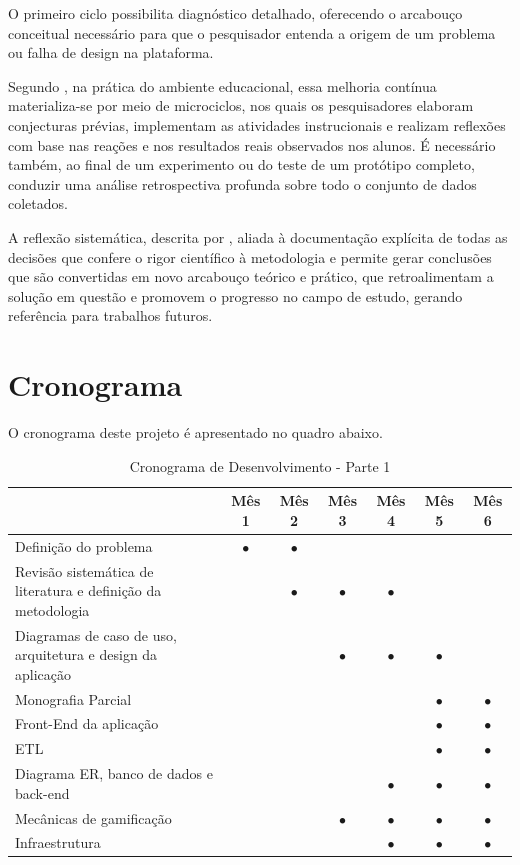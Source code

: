 \documentclass{abnt}
\begin{document}
O primeiro ciclo possibilita diagnóstico detalhado, oferecendo o arcabouço
conceitual necessário para que o pesquisador entenda a origem de um problema ou
falha de design na plataforma. 

Segundo \cite{obrien2018practical}, na prática do ambiente educacional, essa
melhoria contínua materializa-se por meio de microciclos, nos quais os
pesquisadores elaboram conjecturas prévias, implementam as atividades
instrucionais e realizam reflexões com base nas reações e nos resultados reais
observados nos alunos. É necessário também, ao final de um experimento ou do
teste de um protótipo completo, conduzir uma análise retrospectiva profunda
sobre todo o conjunto de dados coletados.

A reflexão sistemática, descrita por \cite{obrien2018practical}, aliada à
documentação explícita de todas as decisões que confere o rigor científico à
metodologia e permite gerar conclusões que são convertidas em novo arcabouço
teórico e prático, que retroalimentam a solução em questão e promovem o
progresso no campo de estudo, gerando referência para trabalhos futuros.

\chapter{Cronograma}
O cronograma deste projeto é apresentado no quadro abaixo.

\begin{table}[ht]
    \centering
    \begin{tabular}{ p{6.6cm} c c c c c c }
        \toprule
                   & Mês 1 & Mês 2 & Mês 3 & Mês 4 & Mês 5 & Mês 6 \\
        \midrule
           Definição do problema & $\bullet$ & $\bullet$ &  &  &  &  \\
        \midrule
           Revisão sistemática de literatura e definição da metodologia  
                   &  & $\bullet$ & $\bullet$ & $\bullet$ &   &  \\
        \midrule
           Diagramas de caso de uso, arquitetura e design da aplicação &  &  &
                   $\bullet$ & $\bullet$ & $\bullet$   &  \\
        \midrule
           Monografia Parcial &  &  &  &  & $\bullet$ & $\bullet$ \\    
        \midrule
           Front-End da aplicação &  &  &  &  & $\bullet$ & $\bullet$ \\
        \midrule
           ETL &  &  &  &  & $\bullet$ & $\bullet$ \\
        \midrule
           Diagrama ER, banco de dados e back-end &  &  &  & $\bullet$ &
                   $\bullet$ & $\bullet$ \\
        \midrule 
           Mecânicas de gamificação &  &  & $\bullet$ & $\bullet$ & $\bullet$ &
                   $\bullet$ \\
        \midrule 
           Infraestrutura &  &  &  & $\bullet$ & $\bullet$ & $\bullet$ \\
        \bottomrule   
    \end{tabular}
    \caption{Cronograma de Desenvolvimento - Parte 1}   
    \label{tab:cronograma-1-2}
\end{table}
\end{document}
